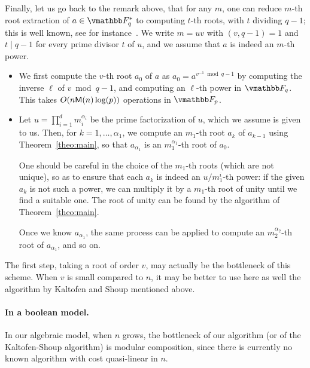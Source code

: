 \medskip

Finally, let us go back to the remark above, that for any $m$, one can
reduce $m$-th root extraction of $a \in \F_q^*$ to computing $t$-th
roots, with $t$ dividing $q-1$; this is well known, see for
instance~\cite[Chapter~7.3]{BachSh1996}. We write $m = uv$ with $(v, q
- 1) = 1$ and $t \mid q - 1$ for every prime divisor $t$ of $u$, and
we assume that $a$ is indeed an $m$-th power.
\begin{itemize}
\item We first compute the $v$-th root $a_0$ of $a$ as
  $a_0=a^{v^{-1} \bmod q - 1}$ by computing the inverse $\ell$ of
  $v \bmod q-1$, and computing an $\ell$-th power in $\F_q$. This
  takes $O(n\mathsf{M}(n)\log(p))$ operations in $\F_p$.
\item Let $u = \prod_{i = 1}^d{m_i^{\alpha_i}}$ be the prime
  factorization of $u$, which we assume is given to us. Then, for $k =
  1, \dots, \alpha_1$, we compute an $m_1$-th root $a_k$ of $a_{k-1}$
  using Theorem~\ref{theo:main}, so that $a_{\alpha_1}$ is an
  $m_1^{\alpha_1}$-th root of $a_0$.

  One should be careful in the choice of the $m_1$-th roots (which are
  not unique), so as to ensure that each $a_k$ is indeed an
  $u/m_1^i$-th power: if the given $a_k$ is not such a power, we can
  multiply it by a $m_1$-th root of unity until we find a suitable
  one.  The root of unity can be found by the algorithm of
  Theorem~\ref{theo:main}.

  Once we know $a_{\alpha_1}$, the same process can be applied to
  compute an $m_2^{\alpha_2}$-th root of $a_{\alpha_1}$, and so on.
\end{itemize}

The first step, taking a root of order $v$, may actually be the
bottleneck of this scheme. When $v$ is small compared to $n$, it may
be better to use here as well the algorithm by Kaltofen and Shoup
mentioned above.


\paragraph{In a boolean model.} In our algebraic model, when $n$ grows, 
the bottleneck of our algorithm (or of the Kaltofen-Shoup algorithm)
is modular composition, since there is currently no known algorithm
with cost quasi-linear in $n$.

